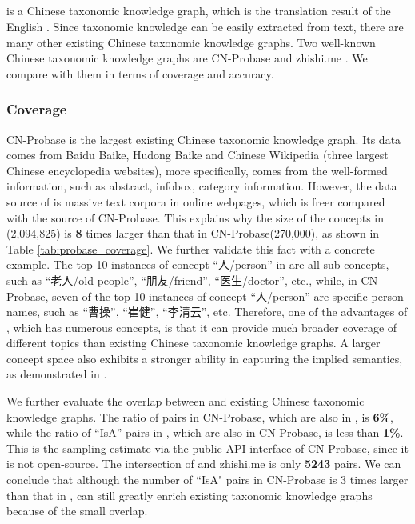 \subsection{\zhpro}
\zhpro is a Chinese taxonomic knowledge graph, which is the translation result of the English \pro. 
Since taxonomic knowledge can be easily extracted from text, there are many other existing Chinese taxonomic knowledge graphs. 
Two well-known Chinese taxonomic knowledge graphs are CN-Probase \cite{Xu2017} and zhishi.me \cite{Niu2011}.
We compare \zhpro with them in terms of coverage and accuracy.
\subsubsection*{Coverage}
CN-Probase is the largest existing Chinese taxonomic knowledge graph.
Its data comes from Baidu Baike, Hudong Baike and Chinese Wikipedia (three largest Chinese encyclopedia websites), more specifically, comes from the well-formed information, such as abstract, infobox, category information. 
However, the data source of \pro is massive text corpora in online webpages, which is freer compared with the source of CN-Probase.
This explains why the size of the concepts in \zhpro (2,094,825) is \textbf{8} times larger than that in CN-Probase(270,000), as shown in Table \ref{tab:probase_coverage}.
We further validate this fact with a concrete example.
The top-10 instances of concept ``人/person'' in \zhpro are all sub-concepts, such as ``老人/old people'', ``朋友/friend'', ``医生/doctor'', etc., 
while, in CN-Probase, seven of the top-10 instances of concept ``人/person'' are specific person names, such as ``曹操'', ``崔健'', ``李清云'', etc.
Therefore, one of the advantages of \zhpro, which has numerous concepts, is that it can provide much broader coverage of different topics than existing Chinese taxonomic knowledge graphs.
A larger concept space also exhibits a stronger ability in capturing the implied semantics, as demonstrated in \cite{wang2010toward}.

We further evaluate the overlap between \zhpro and existing Chinese taxonomic knowledge graphs.
The ratio of pairs in CN-Probase, which are also in \zhpro, is \textbf{6\%}, while the ratio of ``IsA'' pairs in \zhpro, which are also in CN-Probase, is less than \textbf{1\%}.
This is the sampling estimate via the public API interface of CN-Probase, since it is not open-source.
The intersection of \zhpro and zhishi.me is only \textbf{5243} pairs. 
We can conclude that although the number of ``IsA" pairs in CN-Probase is 3 times larger than that in \zhpro, \zhpro can still greatly enrich existing taxonomic knowledge graphs because of the small overlap.

